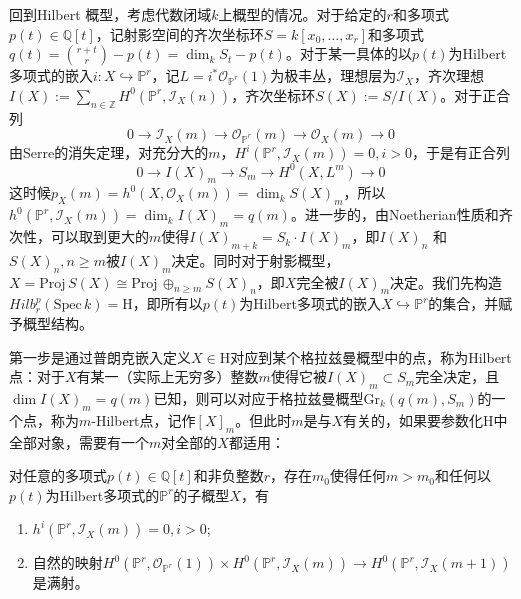 回到Hilbert 概型，考虑代数闭域$ k $上概型的情况。对于给定的$ r $和多项式$ p(t)\in \mathbb{Q}[t] $，记射影空间的齐次坐标环$ S=k[x_0,\ldots,x_r] $和多项式$ q(t)=\binom{r+t}{r}-p(t)=\dim_kS_t-p(t) $。对于某一具体的以$ p(t) $为Hilbert多项式的嵌入$ i:X\hookrightarrow \mathbb{P}^r $，记$ L=i^*\mathscr{O}_{\mathbb{P}^r}(1) $为极丰丛，理想层为$ \mathscr{I}_X $，齐次理想$ I(X):=\sum_{n\in\mathbb{Z}}H^0(\mathbb{P}^r,\mathscr{I}_X(n)) $，齐次坐标环$ S(X):=S/I(X) $。对于正合列
$$0\to \mathscr{I}_X(m)\to \mathscr{O}_{\mathbb{P}^r}(m)\to \mathscr{O}_X(m)\to 0$$
由Serre的消失定理，对充分大的$ m $，$ H^i(\mathbb{P}^r,\mathscr{I}_X(m))=0,i>0 $，于是有正合列
$$ 0 \to I(X)_m \to S_m \to H^0(X,L^m) \to 0 $$
这时候$ p_X(m)=h^0(X,\mathscr{O}_X(m))=\dim_kS(X)_m $，所以$ h^0(\mathbb{P}^r,\mathscr{I}_X(m))=\dim_kI(X)_m=q(m) $。进一步的，由Noetherian性质和齐次性，可以取到更大的$ m $使得$ I(X)_{m+k}=S_k\cdot I(X)_{m}  $，即$ I(X)_n$ 和 $S(X)_n,n\geqslant m $被$ I(X)_m $决定。同时对于射影概型，$ X=\mathrm{Proj} \,S(X)\cong\mathrm{Proj} \,\oplus _{n\geqslant m}S(X)_n $，即$ X $完全被$ I(X)_m $决定。我们先构造$ Hilb_r^p(\mathrm{Spec}\,k)=\mathrm{H} $，即所有以$ p(t) $为Hilbert多项式的嵌入$ X\hookrightarrow \mathbb{P}^r $的集合，并赋予概型结构。

第一步是通过普朗克嵌入定义$ X\in \mathrm{H} $对应到某个格拉兹曼概型中的点，称为Hilbert点：对于$ X $有某一（实际上无穷多）整数$ m $使得它被$ I(X)_m\subset S_m $完全决定，且$ \dim I(X)_m=q(m) $已知，则可以对应于格拉兹曼概型$ \mathrm{Gr}_k(q(m),S_m) $的一个点，称为$ m $-Hilbert点，记作$ [X]_m $。但此时$ m $是与$ X $有关的，如果要参数化$ \mathrm{H} $中全部对象，需要有一个$ m $对全部的$ X $都适用：
\begin{lemma}[\cite{GeometryAlgCurvesII}\uppercase\expandafter{\romannumeral9}.Lemma4.1]\label{uniform m}
	对任意的多项式$ p(t)\in \mathbb{Q}[t] $和非负整数$ r $，存在$ m_0 $使得任何$ m>m_0 $和任何以$ p(t) $为Hilbert多项式的$ \mathbb{P}^r $的子概型$ X $，有
	\begin{enumerate}
		\item $ h^i(\mathbb{P}^r,\mathscr{I}_X(m))=0,i>0 $;
		\item 自然的映射$ H^0(\mathbb{P}^r,\mathscr{O}_{\mathbb{P}^r}(1))\times H^0(\mathbb{P}^r,\mathscr{I}_{X}(m))\to H^0(\mathbb{P}^r,\mathscr{I}_{X}(m+1)) $是满射。
	\end{enumerate}
\end{lemma}

